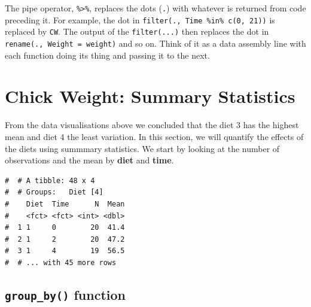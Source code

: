 \documentclass[a4paper,9pt,twocolumn,twoside,printwatermark=false]{pinp}
\begin{document}
The pipe operator, \texttt{\%\textgreater{}\%}, replaces the dots
(\texttt{.}) with whatever is returned from code preceding it. For
example, the dot in \texttt{filter(.,\ Time\ \%in\%\ c(0,\ 21))} is
replaced by \texttt{CW}. The output of the \texttt{filter(...)} then
replaces the dot in \texttt{rename(.,\ Weight\ =\ weight)} and so on.
Think of it as a data assembly line with each function doing its thing
and passing it to the next.

\section{Chick Weight: Summary
Statistics}\label{chick-weight-summary-statistics}

From the data visualisations above we concluded that the diet 3 has the
highest mean and diet 4 the least variation. In this section, we will
quantify the effects of the diets using summmary statistics. We start by
looking at the number of observations and the mean by \textbf{diet} and
\textbf{time}.

\begin{Shaded}
\end{Shaded}

\begin{ShadedResult}
\begin{verbatim}
#  # A tibble: 48 x 4
#  # Groups:   Diet [4]
#    Diet  Time      N  Mean
#    <fct> <fct> <int> <dbl>
#  1 1     0        20  41.4
#  2 1     2        20  47.2
#  3 1     4        19  56.5
#  # ... with 45 more rows
\end{verbatim}
\end{ShadedResult}

\subsection{\texorpdfstring{\texttt{group\_by()}
function}{group\_by() function}}\label{group_by-function}
\end{document}
